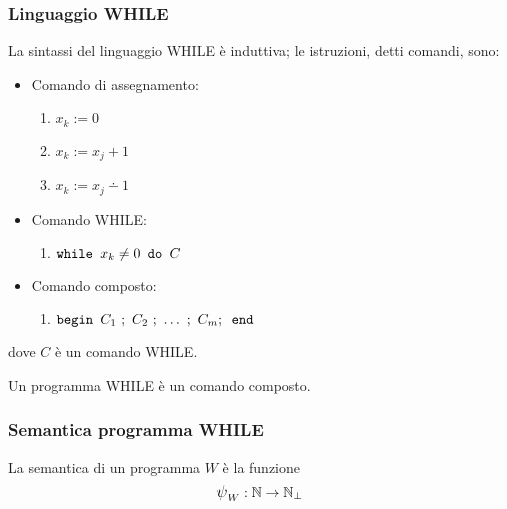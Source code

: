\subsubsection*{Linguaggio WHILE}
La sintassi del linguaggio WHILE è induttiva; le istruzioni, detti comandi, sono:
\begin{itemize}
    \item Comando di assegnamento:
        \begin{enumerate}
            \item $x_k := 0$
            \item $x_k := x_j+1$
            \item $x_k := x_j\dotminus 1$
        \end{enumerate}
    \item Comando WHILE:
        \begin{enumerate}
            \item $ \texttt{while } x_k\neq0 \texttt{ do }  C$
        \end{enumerate}
    \item Comando composto:
        \begin{enumerate}
            \item $\textbegin C_1\ ; \ C_2 \ ; \ \dots \ ; \ C_m; \textend$
        \end{enumerate}
    \end{itemize}
dove $C$ è un comando WHILE.

Un programma WHILE è un comando composto.

\subsubsection*{Semantica programma WHILE}
La semantica di un programma $W$ è la funzione
    $$\semanticaWHILE_W:\N\to\N_\perp$$
